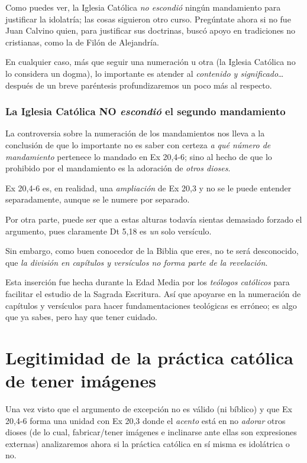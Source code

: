 \documentclass{article}
\begin{document}
\noindent
Como puedes ver, la Iglesia Cat\'olica \emph{no escondi\'o} ning\'un mandamiento para justificar la idolatr\'{i}a; las cosas siguieron otro curso. Preg\'untate ahora si no fue Juan Calvino quien, para justificar sus doctrinas, busc\'o apoyo en tradiciones no cristianas, como la de Fil\'on de Alejandr\'{i}a.

En cualquier caso, m\'as que seguir una numeraci\'on u otra (la Iglesia Cat\'olica no lo considera un dogma), lo importante es atender al \emph{contenido y significado}\ldots despu\'es de un breve par\'entesis profundizaremos un poco m\'as al respecto.

\subsubsection{La Iglesia Cat\'olica NO \emph{escondi\'o} el segundo mandamiento}
La controversia sobre la numeraci\'on de los mandamientos nos lleva a la conclusi\'on de que lo importante no es saber con certeza \emph{a qu\'e n\'umero de mandamiento} pertenece lo mandado en Ex 20,4-6; sino al hecho de que lo prohibido por el mandamiento es la adoraci\'on de \emph{otros dioses}.

Ex 20,4-6 es, en realidad, una \emph{ampliaci\'on} de Ex 20,3 y no se le puede entender separadamente, aunque se le numere por separado.

Por otra parte, puede ser que a estas alturas todav\'{i}a sientas demasiado forzado el argumento, pues claramente Dt 5,18 es \emph{un} solo vers\'{i}culo.

Sin embargo, como buen conocedor de la Biblia que eres, no te ser\'a desconocido, que \emph{la divisi\'on en cap\'{i}tulos y vers\'{i}culos no forma parte de la revelaci\'on}.

Esta inserci\'on fue hecha durante la Edad Media por los \emph{te\'ologos cat\'olicos} para facilitar el estudio de la Sagrada Escritura. As\'{i} que apoyarse en la numeraci\'on de cap\'{i}tulos y vers\'{i}culos para hacer fundamentaciones teol\'ogicas es err\'oneo; es algo que ya sabes, pero hay que tener cuidado.

\section{Legitimidad de la pr\'actica cat\'olica de tener im\'agenes}

Una vez visto que el argumento de excepci\'on no es v\'alido (ni b\'{i}blico) y que Ex 20,4-6 forma una unidad con Ex 20,3 donde el \emph{acento} est\'a en no \emph{adorar} otros dioses (de lo cual, fabricar/tener im\'agenes e inclinarse ante ellas son expresiones externas) analizaremos ahora si la pr\'actica cat\'olica en s\'{i} misma es idol\'atrica o no.
\end{document}

